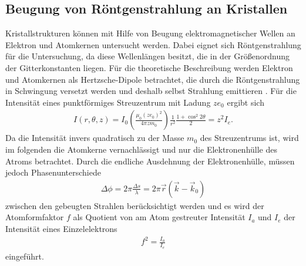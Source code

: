 \FloatBarrier

\subsection{Beugung von Röntgenstrahlung an Kristallen}
\label{subsec:Beugung}
Kristallstrukturen können mit Hilfe von Beugung
elektromagnetischer Wellen an Elektron und Atomkernen untersucht werden.
Dabei eignet sich Röntgenstrahlung
für die Untersuchung, da diese
Wellenlängen besitzt, die in der
Größenordnung der Gitterkonstanten liegen.
Für die theoretische Beschreibung werden Elektron
und Atomkernen
als Hertzsche-Dipole betrachtet, die durch die
Röntgenstrahlung in Schwingung versetzt
werden und deshalb selbst
Strahlung emittieren .
Für die Intensität eines punktförmiges Streuzentrum mit
Ladung $ze_0$ ergibt sich
\begin{align}
I(r,\theta,z) = I_0\left(\frac{\mu_0 (ze_0)^2}{4\pi zm_0}\right)\frac{1}{r^2}\frac{1+\cos^2 2\theta}{2}=z^2 I_e \label{6}.
\end{align}
Da die Intensität invers
quadratisch zu der Masse $m_0$ des Streuzentrums ist,
wird im folgenden die Atomkerne vernachlässigt und
nur die Elektronenhülle des Atroms betrachtet.
Durch die endliche Ausdehnung der Elektronenhülle,
müssen jedoch Phasenunterschiede
\begin{align*}
\Delta\phi=2\pi\frac{\Delta s}{\lambda}= 2\pi\vec{r}\left(\vec{k}-\vec{k}_0\right)
\end{align*}
zwischen den gebeugten
Strahlen berücksichtigt werden und es wird
der Atomformfaktor $f$ als Quotient
von am Atom gestreuter Intensität $I_a$ und $I_e$ der
Intensität eines Einzelelektrons
\begin{align}
f^2=\frac{I_a}{I_e}
\end{align}
eingeführt.

